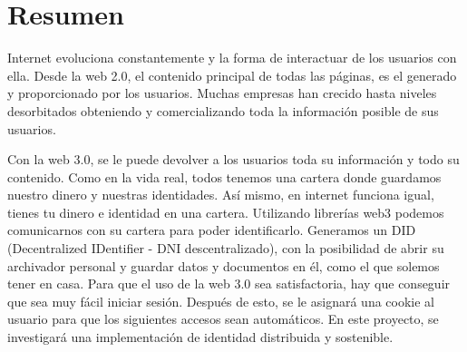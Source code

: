 \documentclass[a4paper,openright,11pt]{book}
\begin{document}
\newpage
\thispagestyle{empty}

\frontmatter


\setcounter{page}{3}

\chapter*{Resumen}

\thispagestyle{fancy}

Internet evoluciona constantemente y la forma de interactuar de los usuarios con ella. Desde la web 2.0, el contenido principal de todas las páginas, es el generado y proporcionado por los usuarios. Muchas empresas han crecido hasta niveles desorbitados obteniendo y comercializando toda la información posible de sus usuarios.

Con la web 3.0, se le puede devolver a los usuarios toda su información y todo su contenido. Como en la vida real, todos tenemos una cartera donde guardamos nuestro dinero y nuestras identidades. Así mismo, en internet funciona igual, tienes tu dinero e identidad en una cartera. Utilizando librerías web3 podemos comunicarnos con su cartera para poder identificarlo. Generamos un DID (Decentralized IDentifier - DNI descentralizado), con la posibilidad de abrir su archivador personal y guardar datos y documentos en él, como el que solemos tener en casa. Para que el uso de la web 3.0 sea satisfactoria, hay que conseguir que sea muy fácil iniciar sesión. Después de esto, se le asignará una cookie al usuario para que los siguientes accesos sean automáticos. En este proyecto, se investigará una implementación de identidad distribuida y sostenible.
\end{document}
